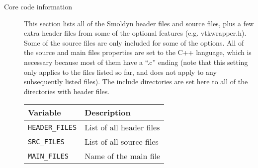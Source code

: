 \documentclass {book}
\newcommand {\ttt} {\texttt}
\begin{document}
\begin{description}
\item[Core code information]
This section lists all of the Smoldyn header files and source files, plus a few extra header files from some of the optional features (e.g. vtkwrapper.h). Some of the source files are only included for some of the options. All of the source and main files properties are set to the C++ language, which is necessary because most of them have a ``.c'' ending (note that this setting only applies to the files listed so far, and does not apply to any subsequently listed files). The include directories are set here to all of the directories with header files.
\begin{longtable}[c]{ll}
Variable & Description\\
\hline
\ttt{HEADER\_FILES} & List of all header files\\
\ttt{SRC\_FILES} & List of all source files\\
\ttt{MAIN\_FILES} & Name of the main file\\
\end{longtable}


\end{description}
\end{document}
